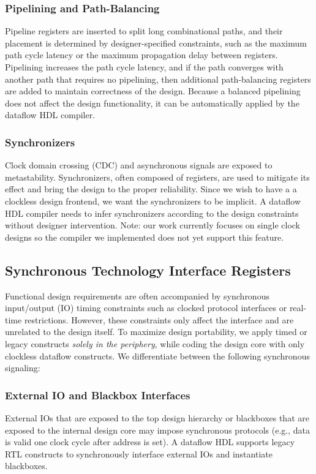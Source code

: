 \subsubsection{Pipelining and Path-Balancing}
Pipeline registers are inserted to split long combinational paths, and their placement is determined by designer-specified constraints, such as the maximum path cycle latency or the maximum propagation delay between registers. Pipelining increases the path cycle latency, and if the path converges with another path that requires no pipelining, then additional path-balancing registers are added to maintain correctness of the design. Because a balanced pipelining does not affect the design functionality, it can be automatically applied by the dataflow HDL compiler.   
\subsubsection{Synchronizers}
Clock domain crossing (CDC) and asynchronous signals are exposed to metastability. Synchronizers, often composed of registers, are used to mitigate its effect and bring the design to the proper reliability. Since we wish to have a a clockless design frontend, we want the synchronizers to be implicit. A dataflow HDL compiler needs to infer synchronizers according to the design constraints without designer intervention. Note: our work currently focuses on single clock designs so the compiler we implemented does not yet support this feature.

\subsection{Synchronous Technology Interface Registers}
Functional design requirements are often accompanied by synchronous input/output (IO) timing constraints such as clocked protocol interfaces or real-time restrictions. However, these constraints only affect the interface and are unrelated to the design itself. To maximize design portability, we apply timed or legacy constructs \emph{solely in the periphery}, while coding the design core with only clockless dataflow constructs. We differentiate between the following synchronous signaling:
\subsubsection{External IO and Blackbox Interfaces}
External IOs that are exposed to the top design hierarchy or blackboxes that are exposed to the internal design core may impose synchronous protocols (e.g., data is valid one clock cycle after address is set). A dataflow HDL supports legacy RTL constructs to synchronously interface external IOs and instantiate blackboxes. 
